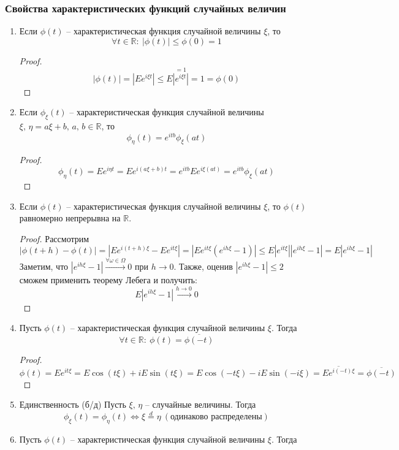 \subsubsection*{Свойства характеристических функций случайных величин}
\begin{enumerate}
	\item Если $\phi(t)$ -- характеристическая функция случайной величины $\xi$, то
	      \[\forall t \in \mathbb{R} :\: |\phi(t)| \leq \phi(0) = 1\]
	      \begin{proof}
		      \[|\phi(t)| = |Ee^{i\xi t}| \leq E\stackrel{= 1}{|e^{i\xi t}|} = 1 = \phi(0)\]
	      \end{proof}
	\item Если $\phi_\xi(t)$ -- характеристическая функция случайной величины $\xi,\, \eta = a\xi + b,\, a,\, b \in \mathbb{R}$, то
	      \[\phi_\eta(t) = e^{itb}\phi_\xi(at)\]
	      \begin{proof}
		      \[\phi_\eta(t) = Ee^{i\eta t} = Ee^{i(a\xi + b)t} = e^{itb}Ee^{i\xi(at)} = e^{itb}\phi_\xi(at)\]
	      \end{proof}
	\item Если $\phi(t)$ -- характеристическая функция случайной величины $\xi$, то $\phi(t)$ равномерно непрерывна на $\mathbb{R}$.
	      \begin{proof}
		      Рассмотрим
		      \[|\phi(t + h) - \phi(t)| = |Ee^{i(t + h)\xi} - Ee^{it\xi}| = |Ee^{it\xi}(e^{ih\xi} - 1)| \leq E|e^{it\xi}||e^{ih\xi} - 1| = E|e^{ih\xi} - 1|\]
		      Заметим, что $|e^{ih\xi} - 1| \stackrel{\forall \omega \in \Omega}{\to} 0$ при $h \to 0$. Также, оценив $|e^{ih\xi} - 1| \leq 2$ сможем применить теорему Лебега и получить:
		      \[E|e^{ih\xi} - 1| \stackrel{h \to 0}{\to} 0\]
	      \end{proof}
	\item Пусть $\phi(t)$ -- характеристическая функция случайной величины $\xi$. Тогда
	      \[\forall t \in \mathbb{R}:\: \phi(t) = \overline{\phi(-t)}\]
	      \begin{proof}
		      \[\phi(t) = Ee^{it\xi} = E\cos(t\xi) + iE\sin(t\xi) = E\cos(-t\xi) - iE\sin(-i\xi) = \overline{Ee^{i(-t)\xi}} = \overline{\phi(-t)}\]
	      \end{proof}
	\item Единственность (б/д)
	      Пусть $\xi,\, \eta$ -- случайные величины. Тогда
	      \[\phi_\xi(t) = \phi_\eta(t) \Leftrightarrow \xi \stackrel{d}{=} \eta \: (\text{одинаково распределены})\]
	\item Пусть $\phi(t)$ -- характеристическая функция случайной величины $\xi$. Тогда

\end{enumerate}
